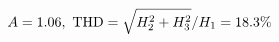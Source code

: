 \documentclass[preview]{standalone}
\begin{document}
\begin{align*}
\special{dvisvgm:raw <g id='unique000'>}A=1.06,\ \text{THD}=\sqrt{H_2^2+H_3^2}/H_1=18.3\%\special{dvisvgm:raw </g>}
\end{align*}
\end{document}
